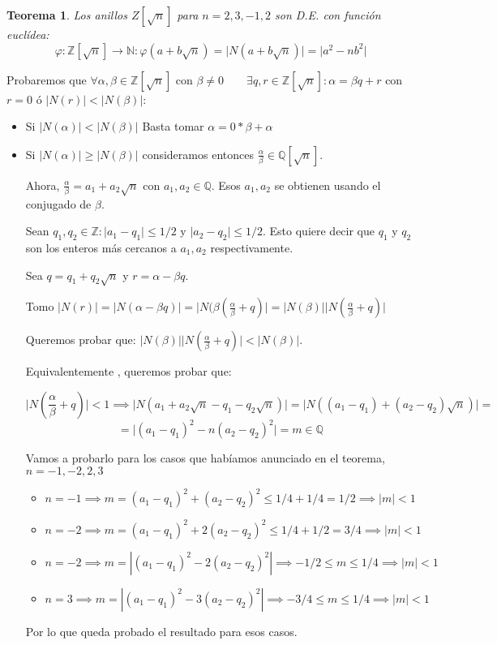 \documentclass[11pt, a4paper, titlepage]{article}
\makeatletter
\renewenvironment{proof}[1][\proofname] {\vspace{-15pt}\par\pushQED{\qed}\normalfont\topsep6\p@\@plus6\p@\relax\trivlist\item[\hskip\labelsep\it#1\@addpunct{.}]\ignorespaces}{\popQED\endtrivlist\@endpefalse}
\providecommand{\ent}{\mathbb{Z}}
\providecommand{\rac}{\mathbb{Q}}
\providecommand{\nat}{\mathbb{N}}
\providecommand{\abs}[1]{\lvert#1\rvert}
\theoremstyle{theorem-style}
\newtheorem*{nth}{Teorema}
\theoremstyle{definition-style}
\theoremstyle{remark-style}
\theoremstyle{example-style}
\makeatother
\begin{document}
\begin{nth}
	Los anillos $Z[\sqrt{n}]$ para $n=2,3,-1,2$ son D.E. con función euclídea:
	\[
	\varphi: \ent[\sqrt{n}] \to \nat : \varphi(a+b\sqrt{n}) = \abs{N(a+b\sqrt{n})} = \abs{a^2 - nb^2}
	\]
	
	
\end{nth}
\begin{proof}
	Probaremos que $\forall \alpha, \beta \in \ent[\sqrt{n}]$ con $\beta \neq 0 \quad \quad \exists q,r \in \ent[\sqrt{n}] : \alpha = \beta q + r$ con $r=0$ ó $\abs{N(r)} < \abs{N(\beta)}$:
	
	\begin{itemize}
	\item Si $\abs{N(\alpha)} < \abs{N(\beta)}$ Basta tomar $\alpha  = 0* \beta + \alpha$
	
	\item Si $\abs{N(\alpha)} \geq \abs{N(\beta)}$ consideramos entonces  $\frac{\alpha}{\beta} \in \rac[\sqrt{n}]$.
	
	Ahora, $\frac{\alpha}{\beta} = a_1 + a_2\sqrt{n}$ con $a_1, a_2 \in \rac $. Esos $a_1,a_2$ se obtienen usando el conjugado de $\beta$.
	
	Sean $q_1,q_2 \in \ent : \abs{a_1-q_1}\leq 1/2$ y $\abs{a_2-q_2}\leq 1/2$. Esto quiere decir que $q_1$ y $q_2$ son los enteros más cercanos a $a_1,a_2$ respectivamente.
	
	Sea $q=q_1+q_2\sqrt{n}$  y $r = \alpha - \beta q$.
	
	Tomo $\abs{N(r)} = \abs{N(\alpha - \beta q)} = \abs{N(\beta(\frac{\alpha}{\beta}+ q)} = \abs{N(\beta)}\abs{N(\frac{\alpha}{\beta}+ q)}$
	
	Queremos probar que: $\abs{N(\beta)}\abs{N(\frac{\alpha}{\beta}+ q)} < \abs{N(\beta)}$.
	
	Equivalentemente , queremos probar que:
	
	\[
	  \abs{N(\frac{\alpha}{\beta}+ q)} < 1 \implies \abs{N(a_1+a_2\sqrt{n}-q_1 -q_2\sqrt{n})} = \abs{N((a_1-q_1) + (a_2-q_2)\sqrt{n})} = \]
	  \[
	 = \abs{(a_1-q_1)^2 - n(a_2-q_2)^2} = m \in \rac
	 \]
	 
Vamos a probarlo para los casos que habíamos anunciado en el teorema, $n = -1,-2,2,3$

\begin{itemize}
	\item $n=-1 \implies m= (a_1-q_1)^2 +(a_2-q_2)^2 \leq 1/4 + 1/4 = 1/2 \implies \abs{m} < 1$
	
	\item $n=-2 \implies m = (a_1-q_1)^2 +2(a_2-q_2)^2 \leq 1/4 + 1/2 = 3/4 \implies \abs{m} < 1$
	
	\item $n=-2 \implies m = |(a_1-q_1)^2 -2(a_2-q_2)^2 |\implies -1/2 \leq m \leq 1/4 \implies \abs{m} < 1$
	
	\item $n=3 \implies m = |(a_1-q_1)^2 -3(a_2-q_2)^2| \implies -3/4 \leq m \leq 1/4 \implies \abs{m} < 1$
\end{itemize}

Por lo que queda probado el resultado para esos casos.
	
\end{itemize} 
\end{proof}
\end{document}
